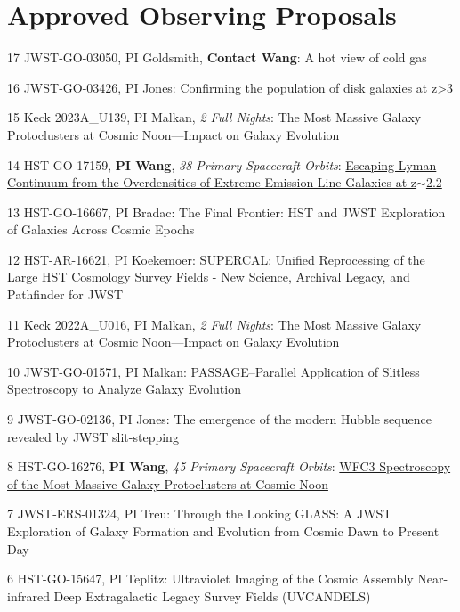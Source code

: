 \documentclass[letterpaper,10pt]{article}
\begin{document}
\vspace*{-.7em}
\section{Approved Observing Proposals}

\begin{list}{}{\leftmargin=1.7em}
    \vspace*{1ex}
    \item[17] JWST-GO-03050, PI Goldsmith, \textbf{Contact Wang}: A hot view of cold gas
    \item[16] JWST-GO-03426, PI Jones: Confirming the population of disk galaxies at z>3
    \item[15] Keck 2023A\_U139, PI Malkan, \emph{2 Full Nights}: The Most Massive Galaxy Protoclusters at Cosmic Noon---Impact on Galaxy Evolution
    \item[14] HST-GO-17159, \textbf{PI Wang}, \emph{38 Primary Spacecraft Orbits}: \href{https://archive.stsci.edu/proposal_search.php?id=17159&mission=hst}{Escaping Lyman Continuum from the Overdensities of Extreme Emission Line Galaxies at z$\sim$2.2}
    \item[13] HST-GO-16667, PI Bradac: The Final Frontier: HST and JWST Exploration of Galaxies Across Cosmic Epochs
    \item[12] HST-AR-16621, PI Koekemoer: SUPERCAL: Unified Reprocessing of the Large HST Cosmology Survey Fields - New Science, Archival Legacy, and Pathfinder for JWST
    \item[11] Keck 2022A\_U016, PI Malkan, \emph{2 Full Nights}: The Most Massive Galaxy Protoclusters at Cosmic Noon---Impact on Galaxy Evolution
    \item[10] JWST-GO-01571, PI Malkan: PASSAGE--Parallel Application of Slitless Spectroscopy to Analyze Galaxy Evolution
    \item[9] JWST-GO-02136, PI Jones: The emergence of the modern Hubble sequence revealed by JWST slit-stepping
    \item[8] HST-GO-16276, \textbf{PI Wang}, \emph{45 Primary Spacecraft Orbits}: \href{https://archive.stsci.edu/proposal_search.php?id=16276&mission=hst}{WFC3 Spectroscopy of the Most Massive Galaxy Protoclusters at Cosmic Noon}
    \item[7] JWST-ERS-01324, PI Treu: Through the Looking GLASS: A JWST Exploration of Galaxy Formation and Evolution from Cosmic Dawn to Present Day
    \item[6] HST-GO-15647, PI Teplitz: Ultraviolet Imaging of the Cosmic Assembly Near-infrared Deep Extragalactic Legacy Survey Fields (UVCANDELS)

\end{list}
\end{document}
